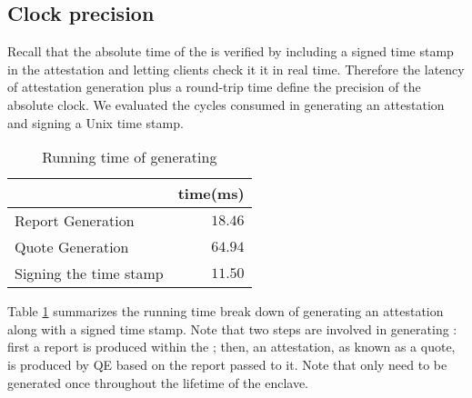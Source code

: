 
\subsection{Clock precision}

Recall that the absolute time of the \encname is verified
by including a signed time stamp in the attestation and letting 
clients check it it in real time. Therefore the latency
of attestation generation plus a round-trip time
define the precision of the absolute clock. 
We evaluated the cycles consumed in generating an attestation and
signing a Unix time stamp.


\begin{table}[ht]
\centering
\begin{tabular}{lr}
\toprule
  & time(ms) \\
\midrule
Report Generation & $18.46$ \\
Quote Generation & $64.94$ \\
Signing the time stamp & $11.50$ \\
\bottomrule
\end{tabular}
\caption{Running time of generating \att}
\label{tab:eval_att}
\end{table}

Table \ref{tab:eval_att} summarizes the running time break down of generating an
attestation along with a signed time stamp.  Note that two steps are involved in
generating \att: first a report is produced within the \encname; then, an
attestation, as known as a quote, is produced by QE based on the report passed
to it. Note that \att only need to be generated once throughout the lifetime of the
enclave.



